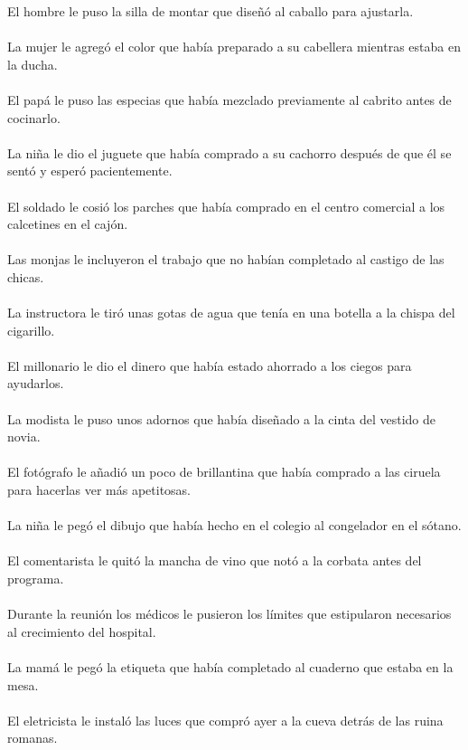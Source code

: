 El hombre le puso la silla de montar que diseñó al caballo para ajustarla.	\\	\\
La mujer le agregó el color que había preparado a su cabellera mientras estaba en la ducha.	\\	\\
El papá le puso las especias que había mezclado previamente al cabrito antes de cocinarlo.	\\	\\
La niña le dio el juguete que había comprado a su cachorro después de que él se sentó y esperó pacientemente.	\\	\\
El soldado le cosió los parches que había comprado en el centro comercial a los calcetines en el cajón.	\\	\\
Las monjas le incluyeron el trabajo que no habían completado al castigo de las chicas.	\\	\\
La instructora le tiró unas gotas de agua que tenía en una botella a la chispa del cigarillo.	\\	\\
El millonario le dio el dinero que había estado ahorrado a los ciegos para ayudarlos.	\\	\\
La modista le puso unos adornos que había diseñado a la cinta del vestido de novia.	\\	\\
El fotógrafo le añadió un poco de brillantina que había comprado a las ciruela para hacerlas ver más apetitosas.	\\	\\
La niña le pegó el dibujo que había hecho en el colegio al congelador en el sótano.	\\	\\
El comentarista le quitó la mancha de vino que notó a la corbata antes del programa.	\\	\\
Durante la reunión los médicos le pusieron los límites que estipularon necesarios al crecimiento del hospital.	\\	\\
La mamá le pegó la etiqueta que había completado al cuaderno que estaba en la mesa.	\\	\\
El eletricista le instaló las luces que compró ayer a la cueva detrás de las ruina romanas.	\\	\\
